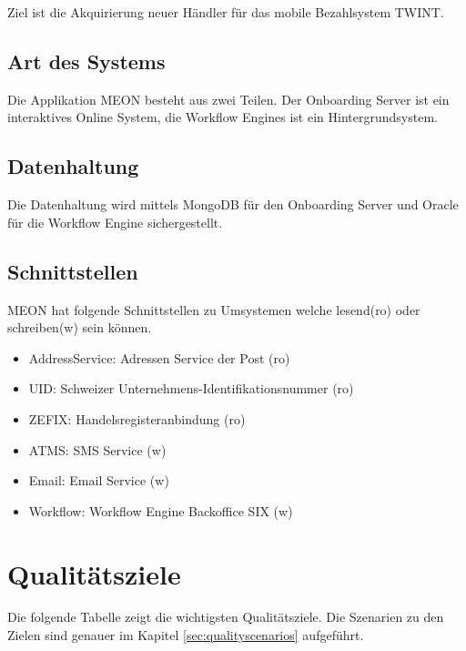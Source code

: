 Ziel ist die Akquirierung neuer Händler für das mobile Bezahlsystem TWINT.

\subsection{Art des Systems}

Die Applikation MEON besteht aus zwei Teilen. Der Onboarding Server ist ein interaktives Online System, die Workflow Engines ist ein Hintergrundsystem.

\subsection{Datenhaltung}

Die Datenhaltung wird mittels MongoDB für den Onboarding Server und Oracle für die Workflow Engine sichergestellt.

\subsection{Schnittstellen}

MEON hat folgende Schnittstellen zu Umsystemen welche lesend(ro) oder schreiben(w) sein können.
\begin{itemize}
	\item AddressService: Adressen Service der Post (ro)
	\item UID: Schweizer Unternehmens-Identifikationsnummer (ro) 
	\item ZEFIX: Handelsregisteranbindung (ro)
	\item ATMS: SMS Service (w)
	\item Email: Email Service (w)
	\item Workflow: Workflow Engine Backoffice SIX (w)
\end{itemize}

\section{Qualitätsziele}

Die folgende Tabelle zeigt die wichtigsten Qualitätsziele. Die Szenarien zu den Zielen sind genauer im Kapitel \ref{sec:qualityscenarios} aufgeführt.


